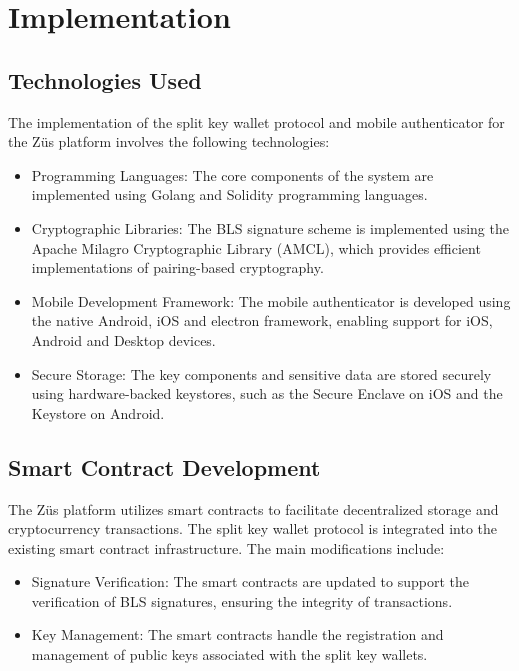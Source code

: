 \chapter{Implementation}
\label{Chapter4}
\section{Technologies Used}
The implementation of the split key wallet protocol and mobile authenticator for the Züs platform involves the following technologies:
\begin{itemize}
    \item Programming Languages: The core components of the system are implemented using Golang and Solidity programming languages.
    \item Cryptographic Libraries: The BLS signature scheme is implemented using the Apache Milagro Cryptographic Library (AMCL), which provides efficient implementations of pairing-based cryptography.
    \item Mobile Development Framework: The mobile authenticator is developed using the native Android, iOS and electron framework, enabling support for iOS, Android and Desktop devices.
    \item Secure Storage: The key components and sensitive data are stored securely using hardware-backed keystores, such as the Secure Enclave on iOS and the Keystore on Android.
\end{itemize}
\section{Smart Contract Development}
The Züs platform utilizes smart contracts to facilitate decentralized storage and cryptocurrency transactions. The split key wallet protocol is integrated into the existing smart contract infrastructure. The main modifications include:
\begin{itemize}
    \item Signature Verification: The smart contracts are updated to support the verification of BLS signatures, ensuring the integrity of transactions.
    \item Key Management: The smart contracts handle the registration and management of public keys associated with the split key wallets.
\end{itemize}

